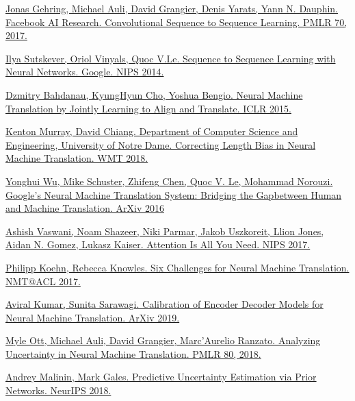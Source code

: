 \documentclass[a4paper,14pt]{extarticle}
\begin{document}
	\newpage
	\begin{thebibliography}{0}		
		\hypertarget{fconv}{}
		\href{https://arxiv.org/pdf/1705.03122.pdf}
		{Jonas Gehring, Michael Auli, David Grangier, Denis Yarats, Yann N. Dauphin. Facebook AI Research. Convolutional Sequence to Sequence Learning. PMLR 70, 2017.}
		
		\hypertarget{seq2seq}{}
		\href{https://papers.nips.cc/paper/5346-sequence-to-sequence-learning-with-neural-networks.pdf}
		{Ilya Sutskever, Oriol Vinyals, Quoc V.Le. Sequence to Sequence Learning with Neural Networks. Google. NIPS 2014.}
		
		\hypertarget{encdec_att}{}
		\href{https://arxiv.org/pdf/1409.0473.pdf}
		{Dzmitry Bahdanau, KyungHyun Cho, Yoshua Bengio. Neural Machine Translation by Jointly Learning to Align and Translate. ICLR 2015.}
		
		\hypertarget{corr_len_bias}{}
		\href{https://arxiv.org/pdf/1808.10006.pdf}
		{Kenton Murray, David Chiang. Department of Computer Science and Engineering, University of Notre Dame. Correcting Length Bias in Neural Machine Translation. WMT 2018.}
		
		\hypertarget{gnmt}{}
		\href{https://arxiv.org/pdf/1609.08144.pdf}
		{Yonghui Wu, Mike Schuster, Zhifeng Chen, Quoc V. Le, Mohammad Norouzi. Google’s Neural Machine Translation System: Bridging the Gapbetween Human and Machine Translation. ArXiv 2016}
		
		\hypertarget{transformer}{}
		\href{https://arxiv.org/pdf/1706.03762.pdf}
		{Ashish Vaswani, Noam Shazeer, Niki Parmar, Jakob Uszkoreit, Llion Jones, Aidan N. Gomez, Lukasz Kaiser. Attention Is All You Need. NIPS 2017.}
		
		\hypertarget{six_chall}{}
		\href{https://arxiv.org/pdf/1706.03872.pdf}
		{Philipp Koehn, Rebecca Knowles. Six Challenges for Neural Machine Translation. NMT@ACL 2017.}
		
		\hypertarget{calibration}{}
		\href{https://arxiv.org/pdf/1903.00802v1.pdf}
		{Aviral Kumar, Sunita Sarawagi. Calibration of Encoder Decoder Models for Neural Machine Translation. ArXiv 2019.}
		
		\hypertarget{anal_uncertainty}{}
		\href{https://arxiv.org/pdf/1803.00047.pdf}
		{Myle Ott, Michael Auli, David Grangier, Marc'Aurelio Ranzato. Analyzing Uncertainty in Neural Machine Translation. PMLR 80, 2018.}
		
		\hypertarget{prior}{}
		\href{https://papers.nips.cc/paper/7936-predictive-uncertainty-estimation-via-prior-networks.pdf}
		{Andrey Malinin, Mark Gales. Predictive Uncertainty Estimation via Prior Networks. NeurIPS 2018.}
	\end{thebibliography}
\end{document}
